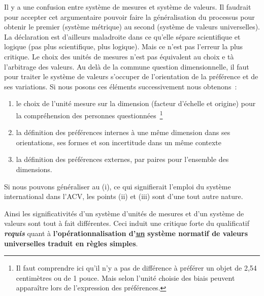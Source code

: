 Il y a une confusion entre système de mesures et système de valeurs.
Il faudrait pour accepter cet argumentaire pouvoir faire la généralisation du processus pour obtenir le premier (système métrique) au second (système de valeurs universelles).
La déclaration est d'ailleurs maladroite dans ce qu'elle sépare scientifique et logique (pas plus scientifique, plus logique).
Mais ce n'est pas l'erreur la plus critique.
Le choix des unités de mesures n'est pas équivalent au choix e tà l'arbitrage des valeurs.
Au delà de la commune question dimensionnelle, il faut pour traiter le système de valeurs s'occuper de l'orientation de la préférence et de ses variations.
Si nous posons ces éléments successivement nous obtenons~:
\begin{enumerate}[label=\roman*]
\item le choix de l'unité mesure sur la dimension (facteur d'échelle et origine) pour la compréhension des personnes questionnées~\footnote{
Il faut comprendre ici qu'il n'y a pas de différence à préférer un objet de 2,54 centimètres ou de 1 pouce.
Mais selon l'unité choisie des biais peuvent apparaître lors de l'expression des préférences.
}
\item la définition des préférences internes à une même dimension dans ses orientations, ses formes et son incertitude dans un même contexte 
\item la définition des préférences externes, par paires pour l'ensemble des dimensions.
\end{enumerate} 
Si nous pouvons généraliser au (i), ce qui signifierait l'emploi du système international dans l'ACV, les points (ii) et (iii) sont d'une tout autre nature.

Ainsi les significativités d'un système d'unités de mesures et d'un système de valeurs sont tout à fait différentes.
Ceci induit une critique forte du qualificatif \emph{\textbf{requis}} quant à \textbf{l'opérationnalisation d'\emph{\underline{un}} système normatif de valeurs universelles traduit en règles simples}.


